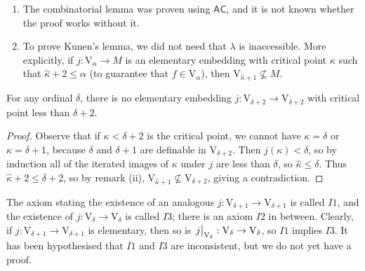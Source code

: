 \begin{remark}
    \begin{enumerate}
        \item The combinatorial lemma was proven using \( \mathsf{AC} \), and it is not known whether the proof works without it.
        \item To prove Kunen's lemma, we did not need that \( \lambda \) is inaccessible.
        More explicitly, if \( j : \mathrm{V}_\alpha \to M \) is an elementary embedding with critical point \( \kappa \) such that \( \hat\kappa + 2 \leq \alpha \) (to guarantee that \( f \in \mathrm{V}_\alpha \)), then \( \mathrm{V}_{\hat\kappa + 1} \nsubseteq M \).
    \end{enumerate}
\end{remark}
\begin{corollary}
    For any ordinal \( \delta \), there is no elementary embedding \( j : \mathrm{V}_{\delta + 2} \to \mathrm{V}_{\delta + 2} \) with critical point less than \( \delta + 2 \).
\end{corollary}
\begin{proof}
    Observe that if \( \kappa < \delta + 2 \) is the critical point, we cannot have \( \kappa = \delta \) or \( \kappa = \delta + 1 \), because \( \delta \) and \( \delta + 1 \) are definable in \( \mathrm{V}_{\delta + 2} \).
    Then \( j(\kappa) < \delta \), so by induction all of the iterated images of \( \kappa \) under \( j \) are less than \( \delta \), so \( \hat\kappa \leq \delta \).
    Thus \( \hat\kappa + 2 \leq \delta + 2 \), so by remark (ii), \( \mathrm{V}_{\hat\kappa + 1} \nsubseteq \mathrm{V}_{\delta + 2} \), giving a contradiction.
\end{proof}
The axiom stating the existence of an analogous \( j : \mathrm{V}_{\delta + 1} \to \mathrm{V}_{\delta + 1} \) is called \( I1 \), and the existence of \( j : \mathrm{V}_\delta \to \mathrm{V}_\delta \) is called \( I3 \); there is an axiom \( I2 \) in between.
Clearly, if \( j : \mathrm{V}_{\delta + 1} \to \mathrm{V}_{\delta + 1} \) is elementary, then so is \( \eval{j}_{\mathrm{V}_\delta} : \mathrm{V}_\delta \to \mathrm{V}_\delta \), so \( I1 \) implies \( I3 \).
It has been hypothesised that \( I1 \) and \( I3 \) are inconsistent, but we do not yet have a proof.
